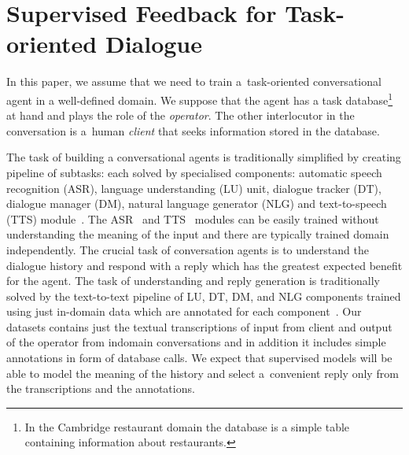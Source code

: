 \documentclass[runningheads,a4paper]{llncs}
\begin{document}

\section{Supervised Feedback for Task-oriented Dialogue} \label{sec:repre}
\vspace{-0.50em}
In this paper, we assume that we need to train a~task-oriented conversational agent in a well-defined domain.
We suppose that the agent has a task database\footnote{In the Cambridge restaurant domain the database is a simple table containing information about restaurants.} at hand and plays the role of the {\it operator}.
The other interlocutor in the conversation is a~human {\it client} that seeks information stored in the database.

The task of building a conversational agents is traditionally simplified by creating pipeline of subtasks: each solved by specialised components: automatic speech recognition (ASR), language understanding (LU) unit, dialogue tracker (DT), dialogue manager (DM), natural language generator (NLG) and text-to-speech (TTS) module~\cite{duvsek2014alex}.
The ASR~\cite{platek2014free} and TTS~\cite{taylor2009text} modules can be easily trained without understanding the meaning of the input and there are typically trained domain independently.
The crucial task of conversation agents is to understand the dialogue history and respond with a reply which has the greatest expected benefit for the agent.
The task of understanding and reply generation is traditionally solved by the text-to-text pipeline of LU, DT, DM, and NLG components trained using just in-domain data which are annotated for each component~\cite{gasic2011line,jurvcivcek2014factored,duvsek2016sequence}.
Our datasets contains just the textual transcriptions of input from client and output of the operator from indomain conversations and in addition it includes simple annotations in form of database calls.
We expect that supervised models will be able to model the meaning of the history and select a~convenient reply only from the transcriptions and the annotations.
\end{document}
